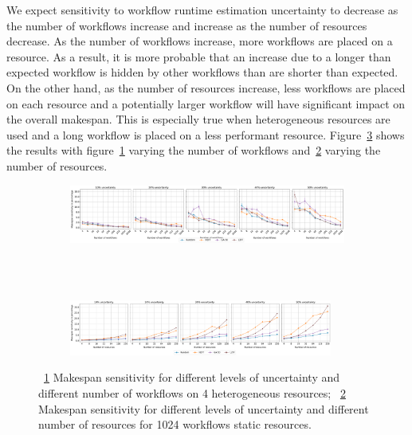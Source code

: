 We expect sensitivity to workflow runtime estimation uncertainty to decrease 
as the number of workflows increase and increase as the number of resources 
decrease. As the number of workflows  increase, more workflows are placed on a 
resource. As a result, it is more probable that an increase due to a longer 
than expected workflow is hidden by other workflows than are shorter than 
expected. On the other hand, as the number of resources increase, less 
workflows are placed on each resource and a potentially larger workflow will 
have significant impact on the overall makespan. This is especially true when 
heterogeneous resources are used and a long workflow is placed on a less 
performant resource. Figure~\ref{fig:inaccur_st} shows the results with 
figure~\ref{fig:InaccurStHeteroCampaigns_4StHeteroResourcesSens} varying the 
number of workflows 
and~\ref{fig:InaccurStHeteroResources_StHeteroCampaignsSens} varying the 
number of resources.

\begin{figure}[ht!]
    \centering
    \begin{subfigure}[b]{0.95\textwidth}
        \includegraphics[width=.95\textwidth]{figures/campaign/InaccurStHeteroCampaigns_4StHeteroResourcesSens.pdf}
        \caption{}
        \label{fig:InaccurStHeteroCampaigns_4StHeteroResourcesSens}
    \end{subfigure}\\
    ~ 
    \begin{subfigure}[b]{0.95\textwidth}
        \includegraphics[width=0.95\textwidth]{figures/campaign/InaccurStHeteroResources_StHeteroCampaignsSens.pdf}
        \caption{}
        \label{fig:InaccurStHeteroResources_StHeteroCampaignsSens}
    \end{subfigure}
    \caption{~\ref{fig:InaccurStHeteroCampaigns_4StHeteroResourcesSens} Makespan sensitivity for different levels of uncertainty and different number of workflows on 4 heterogeneous resources;
    ~\ref{fig:InaccurStHeteroResources_StHeteroCampaignsSens} Makespan sensitivity for different levels of uncertainty and different number of resources for 1024 workflows static resources.}
    \label{fig:inaccur_st}
\end{figure}

